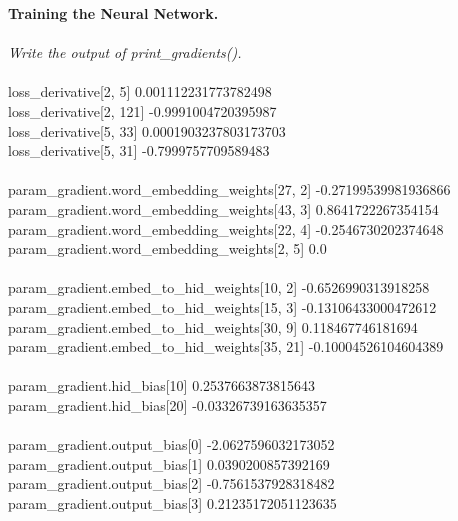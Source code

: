 \documentclass{myhw}
\begin{document}
\begin{homeworkProblem}
\textbf{Training the Neural Network.} \\
\\
\emph{Write the output of print\_gradients().} \\
\\
loss\_derivative[2, 5] 0.001112231773782498 \\
loss\_derivative[2, 121] -0.9991004720395987 \\
loss\_derivative[5, 33] 0.0001903237803173703 \\
loss\_derivative[5, 31] -0.7999757709589483 \\
 \\
param\_gradient.word\_embedding\_weights[27, 2] -0.27199539981936866 \\
param\_gradient.word\_embedding\_weights[43, 3] 0.8641722267354154 \\
param\_gradient.word\_embedding\_weights[22, 4] -0.2546730202374648 \\
param\_gradient.word\_embedding\_weights[2, 5] 0.0 \\
 \\
param\_gradient.embed\_to\_hid\_weights[10, 2] -0.6526990313918258 \\
param\_gradient.embed\_to\_hid\_weights[15, 3] -0.13106433000472612 \\
param\_gradient.embed\_to\_hid\_weights[30, 9] 0.118467746181694 \\
param\_gradient.embed\_to\_hid\_weights[35, 21] -0.10004526104604389 \\
 \\
param\_gradient.hid\_bias[10] 0.2537663873815643 \\
param\_gradient.hid\_bias[20] -0.03326739163635357 \\
 \\
param\_gradient.output\_bias[0] -2.0627596032173052 \\
param\_gradient.output\_bias[1] 0.0390200857392169 \\
param\_gradient.output\_bias[2] -0.7561537928318482 \\
param\_gradient.output\_bias[3] 0.21235172051123635 
\end{homeworkProblem}
\end{document}
